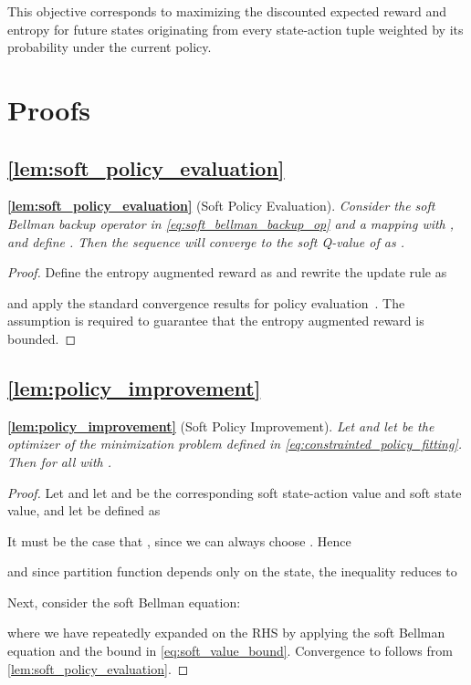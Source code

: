 \documentclass{article}
\begin{document}
This objective corresponds to maximizing the discounted expected reward and entropy for future states originating from every state-action tuple  weighted by its probability  under the current policy.


\section{Proofs}


\subsection{\autoref{lem:soft_policy_evaluation}}
\label{app:lem_soft_policy_evaluation}



\textbf{\autoref{lem:soft_policy_evaluation}} (Soft Policy Evaluation).\textit{
Consider the soft Bellman backup operator  in \autoref{eq:soft_bellman_backup_op} and a mapping  with , and define . Then the sequence  will converge to the soft Q-value of  as .}
\begin{proof}
Define the entropy augmented reward as  and rewrite the update rule as 

and apply the standard convergence results for policy evaluation~\citep{sutton1998reinforcement}. The assumption  is required to guarantee that the entropy augmented reward is bounded.
\end{proof}


\subsection{\autoref{lem:policy_improvement}}
\label{app:lem_policy_improvement}


\textbf{\autoref{lem:policy_improvement}} (Soft Policy Improvement).\textit{
Let  and let  be the optimizer of the minimization problem defined in \autoref{eq:constrainted_policy_fitting}. Then  for all  with .}
\begin{proof}
Let  and let  and  be the corresponding soft state-action value and soft state value, and let  be defined as 

It must be the case that , since we can always choose . Hence

and since partition function  depends only on the state, the inequality reduces to

Next, consider the soft Bellman equation:

where we have repeatedly expanded  on the RHS by applying the soft Bellman equation and the bound in \autoref{eq:soft_value_bound}. Convergence to  follows from \autoref{lem:soft_policy_evaluation}.
\end{proof}
\end{document}

